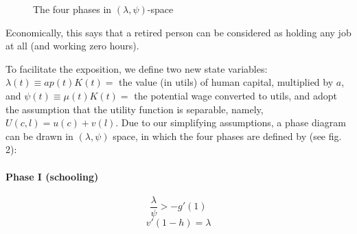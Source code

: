 \documentclass[11pt,fleqn]{article}
\begin{document}
\begin{figure}[htbp]
\centering
{}
\caption{The four phases in $(\lambda, \psi)$-space}
\label{fig:phases_space}
\end{figure}

Economically, this says that a retired person can be considered as holding any job at all (and working zero hours).

To facilitate the exposition, we define two new state variables: $\lambda(t) \equiv a p(t) K(t) =$ the value (in utils) of human capital, multiplied by $a$, and $\psi(t) \equiv \mu(t) K(t) =$ the potential wage converted to utils, and adopt the assumption that the utility function is separable, namely, $U(c, l) = u(c) + v(l)$. Due to our simplifying assumptions, a phase diagram can be drawn in $(\lambda, \psi)$ space, in which the four phases are defined by (see fig. 2):

\paragraph{Phase I (schooling)}
\begin{equation}
\frac{\lambda}{\psi} > -g'(1)
\end{equation}
\begin{equation}
v'(1 - h) = \lambda
\end{equation}
\end{document}
